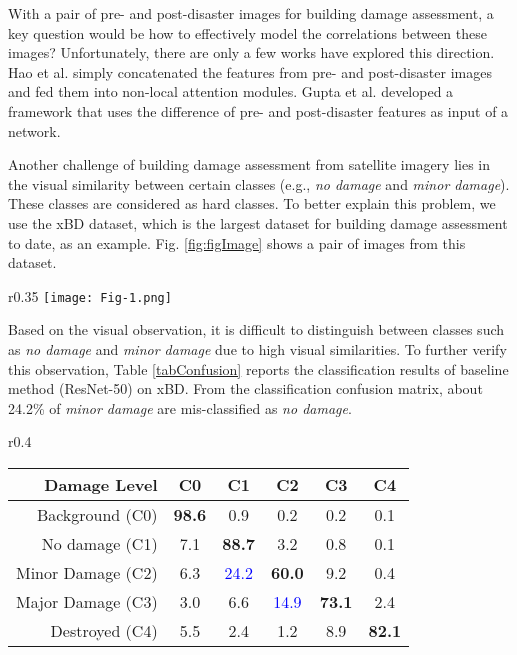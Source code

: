 \documentclass{article}
\begin{document}
With a pair of pre- and post-disaster images for building damage assessment, a key question would be how to effectively model the correlations between these images? Unfortunately, there are only a few works have explored this direction.  
Hao et al. \cite{hao2020attention} simply concatenated the features from pre- and post-disaster images and fed them into non-local attention modules. Gupta et al. \cite{gupta2020rescuenet} developed a framework that uses the difference of pre- and post-disaster features as input of a network.

Another challenge of building damage assessment from satellite imagery lies in the visual similarity between certain classes (e.g., \textit{no damage} and \textit{minor damage}). These classes are considered as hard classes. To better explain this problem, we use the xBD \cite{gupta2019xbd} dataset, which is the largest dataset for building damage assessment to date, as an example. Fig. \ref{fig:figImage} shows a pair of images from this dataset. 
\begin{wrapfigure}{r}{0.35\textwidth}
    \vspace{-0.2cm}
    \texttt{[image: Fig-1.png]} 
\caption{A pair of images and their annotations from the xBD dataset.}
\label{fig:figImage}
\end{wrapfigure}
Based on the visual observation, it is difficult to distinguish between classes such as \textit{no damage} and \textit{minor damage} due to high visual similarities. To further verify this observation, Table \ref{tabConfusion} reports the classification results of baseline method (ResNet-50) on xBD. From the classification confusion matrix, about 24.2\% of \emph{minor damage} are mis-classified as \emph{no damage}. \begin{wraptable}{r}{0.4\textwidth}
\vspace{-\intextsep}
  \caption{Classification confusion matrix (\%)  of ResNet-50 baseline on xBD test set.}
  \vspace{-\intextsep}
  \scriptsize
  \begin{center}
  \setlength\tabcolsep{3.0pt} 
  \renewcommand{\arraystretch}{0.6}\begin{tabular}{rccccc}
    \toprule
Damage Level  & C0 & C1 & C2  & C3 & C4 \\
    \midrule
    Background (C0) &\textbf{98.6} &	0.9 &	0.2&	0.2 &	0.1 \\
    No damage (C1) & 7.1&	\textbf{88.7} &	3.2&	0.8&	0.1\\
    Minor Damage (C2) & 6.3 &	\textcolor{blue}{24.2}&	\textbf{60.0} &	9.2&	0.4\\
    Major Damage (C3)  & 3.0 &	6.6	& \textcolor{blue}{14.9}&	\textbf{73.1} &	2.4\\
    Destroyed (C4) & 5.5 &	2.4&	1.2&	8.9&	 \textbf{82.1} \\
    \bottomrule
  \end{tabular}
  \vspace{-\intextsep}
  \end{center}
 \label{tabConfusion}
\end{wraptable}
\end{document}
